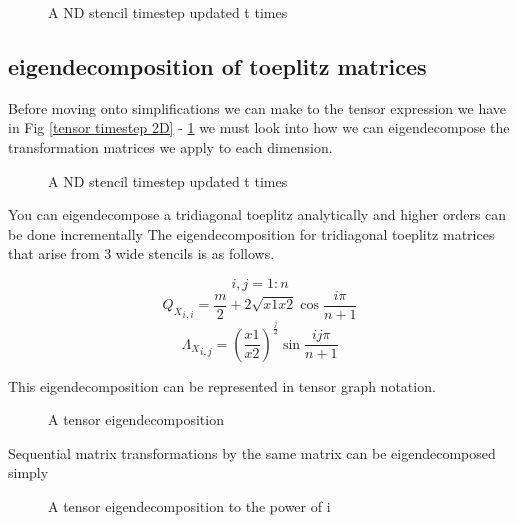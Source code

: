 \documentclass{article}
\begin{document}
\begin{figure}[H]
	\begin{mdframed}[backgroundcolor=myFigureColour]
		
		\caption{A ND stencil timestep updated t times}
		\label{tensor timestep ND}
	\end{mdframed}
\end{figure}

\subsection{eigendecomposition of toeplitz matrices}

Before moving onto simplifications we can make to the tensor expression we have in Fig \ref{tensor timestep 2D} - \ref{tensor timestep ND} we must look into how we can eigendecompose the transformation matrices we apply to each dimension.

\begin{figure}[H]
	\begin{mdframed}[backgroundcolor=myFigureColour]
		
		\caption{A ND stencil timestep updated t times}
	\end{mdframed}
\end{figure}

You can eigendecompose a tridiagonal toeplitz analytically and higher orders can be done incrementally \cite{bogoya2022fast}
The eigendecomposition for tridiagonal toeplitz matrices that arise from 3 wide stencils is as follows.


\[ i,j = 1:n\]
\[ {Q_X}_{i,i} = \frac{m}{2} + 2\sqrt{x1 x2}\cos{\frac{i\pi}{n+1}}\]
\[ {\Lambda_X}_{i,j} = (\frac{x1}{x2})^{\frac{j}{2}}\sin{\frac{ij\pi}{n+1}} \]

This eigendecomposition can be represented in tensor graph notation.

\begin{figure}[H]
	\begin{mdframed}[backgroundcolor=myFigureColour]
	
	\caption{A tensor eigendecomposition}
\end{mdframed}
\end{figure}

Sequential matrix transformations by the same matrix can be eigendecomposed simply

\begin{figure}[H]
	\begin{mdframed}[backgroundcolor=myFigureColour]
	
	\caption{A tensor eigendecomposition to the power of i}
\end{mdframed}
\end{figure}
\end{document}
